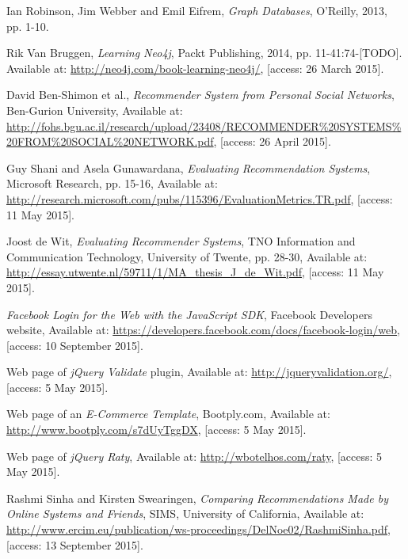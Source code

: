 \documentclass[12pt]{report}
\begin{document}
\begin{thebibliography}{99}
Ian Robinson, Jim Webber and Emil Eifrem, \textit{Graph Databases}, O'Reilly, 2013, pp. 1-10.

Rik Van Bruggen, \textit{Learning Neo4j}, Packt Publishing, 2014, pp. 11-41:74-[TODO]. Available at: \url{http://neo4j.com/book-learning-neo4j/}, [access: 26 March 2015].

David Ben-Shimon et al., \textit{Recommender System from Personal Social Networks}, Ben-Gurion University, Available at: \url{http://fohs.bgu.ac.il/research/upload/23408/RECOMMENDER%20SYSTEMS%20FROM%20SOCIAL%20NETWORK.pdf}, [access: 26 April 2015].

Guy Shani and Asela Gunawardana, \textit{Evaluating Recommendation Systems}, Microsoft Research, pp. 15-16, Available at: \url{http://research.microsoft.com/pubs/115396/EvaluationMetrics.TR.pdf}, [access: 11 May 2015].

Joost de Wit, \textit{Evaluating Recommender Systems}, TNO Information and Communication Technology, University of Twente, pp. 28-30, Available at: \url{http://essay.utwente.nl/59711/1/MA_thesis_J_de_Wit.pdf}, [access: 11 May 2015].

\textit{Facebook Login for the Web with the JavaScript SDK}, Facebook Developers website, Available at: \url{https://developers.facebook.com/docs/facebook-login/web}, [access: 10 September 2015].

Web page of \textit{jQuery Validate} plugin, Available at: \url{http://jqueryvalidation.org/}, [access: 5 May 2015].

Web page of an \textit{E-Commerce Template}, Bootply.com, Available at: \url{http://www.bootply.com/s7dUyTggDX}, [access: 5 May 2015].

Web page of \textit{jQuery Raty}, Available at: \url{http://wbotelhos.com/raty}, [access: 5 May 2015].

Rashmi Sinha and Kirsten Swearingen, \textit{Comparing Recommendations Made by Online Systems and Friends}, SIMS, University of California, Available at: \url{http://www.ercim.eu/publication/ws-proceedings/DelNoe02/RashmiSinha.pdf}, [access: 13 September 2015].

\end{thebibliography}

\listoffigures

\listoftables
\end{document}
